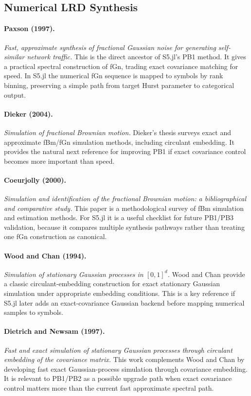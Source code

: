 \documentclass[11pt]{article}
\begin{document}
\subsection{Numerical LRD Synthesis}

\paragraph{Paxson (1997).}
\emph{Fast, approximate synthesis of fractional Gaussian noise for generating
self-similar network traffic.}
This is the direct ancestor of S5.jl's PB1 method. It gives a practical spectral
construction of fGn, trading exact covariance matching for speed. In S5.jl the
numerical fGn sequence is mapped to symbols by rank binning, preserving a simple
path from target Hurst parameter to categorical output.

\paragraph{Dieker (2004).}
\emph{Simulation of fractional Brownian motion.}
Dieker's thesis surveys exact and approximate fBm/fGn simulation methods,
including circulant embedding. It provides the natural next reference for
improving PB1 if exact covariance control becomes more important than speed.

\paragraph{Coeurjolly (2000).}
\emph{Simulation and identification of the fractional Brownian motion: a
bibliographical and comparative study.}
This paper is a methodological survey of fBm simulation and estimation methods.
For S5.jl it is a useful checklist for future PB1/PB3 validation, because it
compares multiple synthesis pathways rather than treating one fGn construction
as canonical.

\paragraph{Wood and Chan (1994).}
\emph{Simulation of stationary Gaussian processes in $[0,1]^d$.}
Wood and Chan provide a classic circulant-embedding construction for exact
stationary Gaussian simulation under appropriate embedding conditions. This is a
key reference if S5.jl later adds an exact-covariance Gaussian backend before
mapping numerical samples to symbols.

\paragraph{Dietrich and Newsam (1997).}
\emph{Fast and exact simulation of stationary Gaussian processes through
circulant embedding of the covariance matrix.}
This work complements Wood and Chan by developing fast exact Gaussian-process
simulation through covariance embedding. It is relevant to PB1/PB2 as a possible
upgrade path when exact covariance control matters more than the current fast
approximate spectral path.
\end{document}
